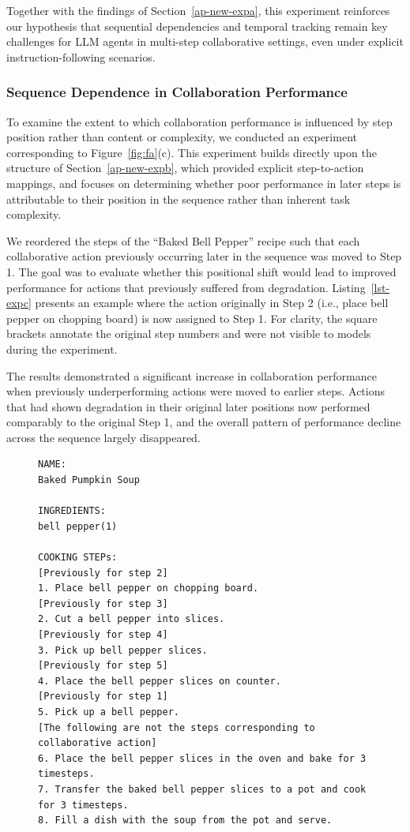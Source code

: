 \documentclass[11pt]{article}
\begin{document}
Together with the findings of Section~\ref{ap-new-expa}, this experiment reinforces our hypothesis that sequential dependencies and temporal tracking remain key challenges for LLM agents in multi-step collaborative settings, even under explicit instruction-following scenarios.



\subsubsection{Sequence Dependence in Collaboration Performance}

\label{ap-new-expc}

To examine the extent to which collaboration performance is influenced by step position rather than content or complexity, we conducted an experiment corresponding to Figure~\ref{fig:fa}(c). This experiment builds directly upon the structure of Section~\ref{ap-new-expb}, which provided explicit step-to-action mappings, and focuses on determining whether poor performance in later steps is attributable to their position in the sequence rather than inherent task complexity.

We reordered the steps of the ``Baked Bell Pepper'' recipe such that each collaborative action previously occurring later in the sequence was moved to Step 1. The goal was to evaluate whether this positional shift would lead to improved performance for actions that previously suffered from degradation. Listing~\ref{lst-expc} presents an example where the action originally in Step 2 (i.e., place bell pepper on chopping board) is now assigned to Step 1. For clarity, the square brackets annotate the original step numbers and were not visible to models during the experiment.

The results demonstrated a significant increase in collaboration performance when previously underperforming actions were moved to earlier steps. Actions that had shown degradation in their original later positions now performed comparably to the original Step 1, and the overall pattern of performance decline across the sequence largely disappeared.

\begin{figure}[H]
\begin{lstlisting}[caption={Rearranged recipe of "Baked Pumpkin Soup"},label={lst-expc}]
NAME:
Baked Pumpkin Soup

INGREDIENTS:
bell pepper(1)

COOKING STEPs: 
[Previously for step 2]
1. Place bell pepper on chopping board.
[Previously for step 3]
2. Cut a bell pepper into slices.
[Previously for step 4]
3. Pick up bell pepper slices.
[Previously for step 5]
4. Place the bell pepper slices on counter.
[Previously for step 1]
5. Pick up a bell pepper.
[The following are not the steps corresponding to collaborative action]
6. Place the bell pepper slices in the oven and bake for 3 timesteps.
7. Transfer the baked bell pepper slices to a pot and cook for 3 timesteps.
8. Fill a dish with the soup from the pot and serve. 
\end{lstlisting}
\end{figure}
\end{document}
